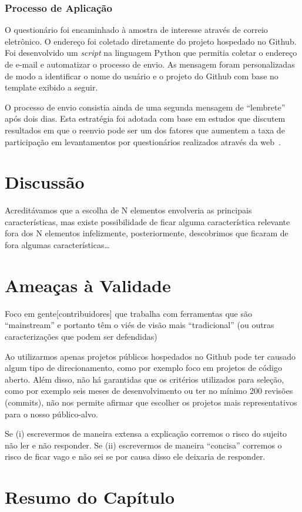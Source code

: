 
\subsubsection{Processo de Aplicação}
\label{ssub:processo_de_aplicação}

O questionário foi encaminhado à amostra de interesse através de correio
eletrônico. O endereço foi coletado diretamente do projeto hospedado no Github.
Foi desenvolvido um \textit{script} na linguagem Python que permitia coletar o
endereço de e-mail e automatizar o processo de envio. As mensagem foram
personalizadas de modo a identificar o nome do usuário e o projeto do Github
com base no template exibido a seguir.


O processo de envio consistia ainda de uma segunda mensagem de ``lembrete'' após
dois dias. Esta estratégia foi adotada com base em estudos que discutem
resultados em que o reenvio pode ser um dos fatores que aumentem a taxa de
participação em levantamentos por questionários realizados através da
web~\cite{fan2010factors}.

\section{Discussão}
\label{sec:sug_melhoria_discussao}

Acreditávamos que a escolha de N elementos envolveria as principais
características, mas existe possibilidade de ficar alguma característica
relevante fora dos N elementos infelizmente, posteriormente, descobrimos que
ficaram de fora algumas características\dots

\section{Ameaças à Validade}
\label{sec:sug_melhoria_ameacas}

Foco em gente[contribuidores] que trabalha com ferramentas que são
``mainstream'' e portanto têm o viés de visão mais ``tradicional'' (ou outras
caracterizações que podem ser defendidas)

Ao utilizarmos apenas projetos públicos hospedados no Github pode ter causado
algum tipo de direcionamento, como por exemplo foco em projetos de código
aberto. Além disso, não há garantidas que os critérios utilizados para seleção,
como por exemplo seis meses de desenvolvimento ou ter no mínimo 200 revisões
(commits), não nos permite afirmar que escolher os projetos mais
representativos para o nosso público-alvo.

Se (i) escrevermos de maneira extensa a explicação corremos o risco do sujeito
não ler e não responder. Se (ii) escrevermos de maneira ``concisa'' corremos o
risco de ficar vago e não sei se por causa disso ele deixaria de responder.

\section{Resumo do Capítulo}
\label{sec:sug_melhoria_resumo}
